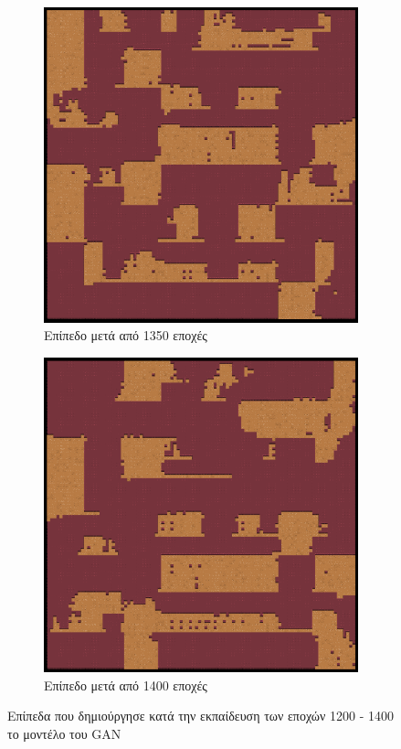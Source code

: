 \begin{figure}[H]
\begin{subfigure}{.5\textwidth}
  \centering
  \includegraphics[width=.8\linewidth]{../images/generated/1350.png}
  \caption{Επίπεδο μετά από 1350 εποχές}
  \label{fig:sfig2}
\end{subfigure}
\begin{subfigure}{.5\textwidth}
  \centering
  \includegraphics[width=.8\linewidth]{../images/generated/1400.png}
  \caption{Επίπεδο μετά από 1400 εποχές}
  \label{fig:sfig2}
\end{subfigure}
\caption{Επίπεδα που δημιούργησε κατά την εκπαίδευση των εποχών 1200 - 1400 το μοντέλο του GAN}
\label{fig:fig}
\end{figure}

